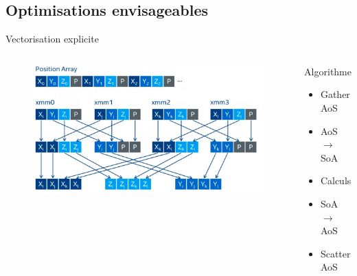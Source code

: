 \documentclass[9.5pt]{beamer}
\begin{document}
	\subsection{Optimisations envisageables}
		\begin{frame}{Vectorisation explicite}
			\begin{columns}
					\begin{figure}
						\includegraphics[width=\linewidth]{images/vecto.png}
					\end{figure}
					\begin{block}{Algorithme}
						\begin{itemize}
							\item Gather AoS
							\item AoS $\longrightarrow$ SoA
							\item Calculs
							\item SoA $\longrightarrow$ AoS
							\item Scatter AoS
						\end{itemize}
					\end{block}
			\end{columns}
		\end{frame}
\end{document}
